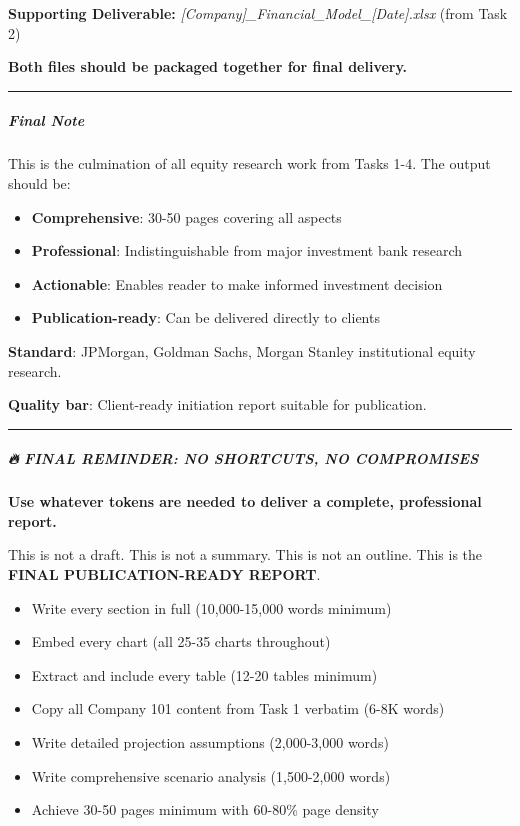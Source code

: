\documentclass[11pt]{article}
\begin{document}
\textbf{Supporting Deliverable:} \emph{[Company]\_\allowbreak{}Financial\_\allowbreak{}Model\_\allowbreak{}[Date].xlsx} (from Task 2)


\textbf{Both files should be packaged together for final delivery.}


\vspace{0.5em}\hrule\vspace{0.5em}

\subparagraph{Final Note}\mbox{}\par

This is the culmination of all equity research work from Tasks 1-4. The output should be:

\begin{itemize}[leftmargin=*,itemsep=2pt,topsep=2pt]
\item {} \textbf{Comprehensive}: 30-50 pages covering all aspects
\item {} \textbf{Professional}: Indistinguishable from major investment bank research
\item {} \textbf{Actionable}: Enables reader to make informed investment decision
\item {} \textbf{Publication-ready}: Can be delivered directly to clients
\end{itemize}

\textbf{Standard}: JPMorgan, Goldman Sachs, Morgan Stanley institutional equity research.


\textbf{Quality bar}: Client-ready initiation report suitable for publication.


\vspace{0.5em}\hrule\vspace{0.5em}

\subparagraph{🔥 FINAL REMINDER: NO SHORTCUTS, NO COMPROMISES}\mbox{}\par

\textbf{Use whatever tokens are needed to deliver a complete, professional report.}


This is not a draft. This is not a summary. This is not an outline. This is the \textbf{FINAL PUBLICATION-READY REPORT}.


\begin{itemize}[leftmargin=*,itemsep=2pt,topsep=2pt]
\item {} Write every section in full (10,000-15,000 words minimum)
\item {} Embed every chart (all 25-35 charts throughout)
\item {} Extract and include every table (12-20 tables minimum)
\item {} Copy all Company 101 content from Task 1 verbatim (6-8K words)
\item {} Write detailed projection assumptions (2,000-3,000 words)
\item {} Write comprehensive scenario analysis (1,500-2,000 words)
\item {} Achieve 30-50 pages minimum with 60-80\% page density
\end{itemize}
\end{document}
